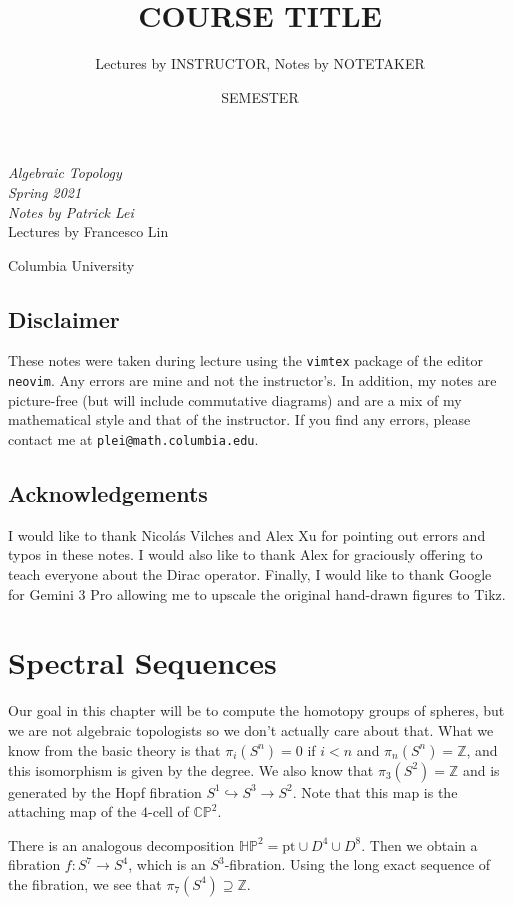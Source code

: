 \documentclass[leqno, openany]{memoir}
\title{COURSE TITLE}
\author{Lectures by INSTRUCTOR, Notes by NOTETAKER}
\date{SEMESTER}
\theoremstyle{definition}
\theoremstyle{remark}
\theoremstyle{plain}
\theoremstyle{definition}
\theoremstyle{remark}
\renewcommand{\H}{\mathbb{H}}
\newcommand{\C}{\mathbb{C}}
\newcommand{\Z}{\mathbb{Z}}
\renewcommand{\P}{\mathbb{P}}
\newcommand{\mr}[1]{\mathrm{#1}}
\newcommand*{\titleSW}
    {\begingroup%
    \raggedleft
    \vspace*{\baselineskip}
    {\Huge\itshape Algebraic Topology \\ Spring 2021}\\[\baselineskip]
    {\large\itshape Notes by Patrick Lei}\\[0.2\textheight]
    {\Large Lectures by Francesco Lin}\par
    \vfill
    {\Large \sffamily Columbia University}
    \vspace*{\baselineskip}
\endgroup}
\begin{document}
    
\begin{titlingpage}
\titleSW
\end{titlingpage}

\thispagestyle{empty}
\section*{Disclaimer}%
\label{sec:disclaimer}

These notes were taken during lecture using the \texttt{vimtex} package of the editor \texttt{neovim}. 
Any errors are mine and not the instructor's. 
In addition, my notes are picture-free (but will include commutative diagrams) and are a mix of my mathematical style and that of the instructor.
If you find any errors, please contact me at \texttt{plei@math.columbia.edu}.

\section*{Acknowledgements}%
\label{sec:acknowledgements}

I would like to thank Nicol\'as Vilches and Alex Xu for pointing out errors and typos in these notes. I would also like to thank Alex for graciously offering to teach everyone about the Dirac operator. Finally, I would like to thank Google for Gemini 3 Pro allowing me to upscale the original hand-drawn figures to Tikz.


\newpage


\tableofcontents

\chapter{Spectral Sequences}%
\label{cha:spectral_sequences}

Our goal in this chapter will be to compute the homotopy groups of spheres, but we are not algebraic topologists so we don't actually care about that. What we know from the basic theory is that $\pi_i(S^n) = 0$ if $i < n$ and $\pi_n(S^n) = \Z$, and this isomorphism is given by the degree. We also know that $\pi_3(S^2) = \Z$ and is generated by the Hopf fibration $S^1 \hookrightarrow S^3 \to S^2$. Note that this map is the attaching map of the $4$-cell of $\C\P^2$.

There is an analogous decomposition $\H\P^2 = \mr{pt} \cup D^4 \cup D^8$. Then we obtain a fibration $f \colon S^7 \to S^4$, which is an $S^3$-fibration. Using the long exact sequence of the fibration, we see that $\pi_7(S^4) \supseteq \Z$.
\end{document}
